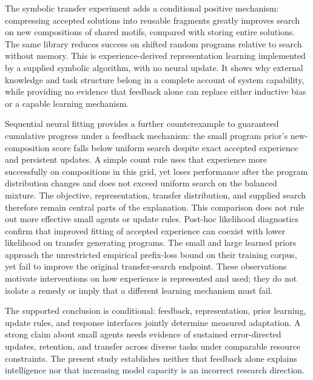 \documentclass[11pt]{article}
\begin{document}
The symbolic transfer experiment adds a conditional positive mechanism:
compressing accepted solutions into reusable fragments greatly improves search
on new compositions of shared motifs, compared with storing entire solutions.
The same library reduces success on shifted random programs relative to
search without memory. This is experience-derived representation learning
implemented by a supplied symbolic algorithm, with no neural update. It shows
why external knowledge and task structure belong in a complete account of
system capability, while providing no evidence that feedback alone can replace
either inductive bias or a capable learning mechanism.

Sequential neural fitting provides a further counterexample to guaranteed
cumulative progress under a feedback mechanism: the small program prior's
new-composition score falls below uniform search despite exact accepted
experience and persistent updates. A simple count rule uses that experience
more successfully on compositions in this grid, yet loses performance after
the program distribution changes and does not exceed uniform search on the
balanced mixture. The objective, representation, transfer distribution, and
supplied search therefore remain central parts of the explanation. This
comparison does not rule out more effective small agents or update rules.
Post-hoc likelihood diagnostics confirm that improved fitting of accepted
experience can coexist with lower likelihood on transfer generating programs.
The small and large learned priors approach the unrestricted empirical
prefix-loss bound on their training corpus, yet fail to improve the original
transfer-search endpoint. These observations motivate interventions on how
experience is represented and used; they do not isolate a remedy or imply
that a different learning mechanism must fail.

The supported conclusion is conditional: feedback, representation, prior
learning, update rules, and response interfaces jointly determine measured
adaptation. A strong claim about small agents needs evidence of sustained
error-directed updates, retention, and transfer across diverse tasks under
comparable resource constraints. The present study establishes neither that
feedback alone explains intelligence nor that increasing model capacity is an
incorrect research direction.
\end{document}
